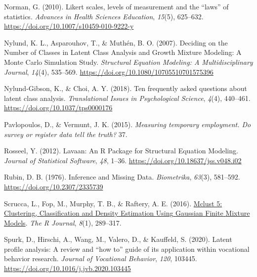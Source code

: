\documentclass[
  ,man,floatsintext]{apa6}
\newlength{\cslhangindent}
\newlength{\cslentryspacingunit} %
\newenvironment{CSLReferences}[2] %
 {%
  \setlength{\parindent}{0pt}
  \ifodd #1
  \let\oldpar\par
  \def\par{\hangindent=\cslhangindent\oldpar}
  \fi
  \setlength{\parskip}{#2\cslentryspacingunit}
 }%
 {}
\begin{document}
\begin{CSLReferences}{1}{0}
\leavevmode{}%
Norman, G. (2010). Likert scales, levels of measurement and the {``laws''} of statistics. \emph{Advances in Health Sciences Education}, \emph{15}(5), 625--632. \url{https://doi.org/10.1007/s10459-010-9222-y}

\leavevmode{}%
Nylund, K. L., Asparouhov, T., \& Muthén, B. O. (2007). Deciding on the {Number} of {Classes} in {Latent} {Class} {Analysis} and {Growth} {Mixture} {Modeling}: {A} {Monte} {Carlo} {Simulation} {Study}. \emph{Structural Equation Modeling: A Multidisciplinary Journal}, \emph{14}(4), 535--569. \url{https://doi.org/10.1080/10705510701575396}

\leavevmode{}%
Nylund-Gibson, K., \& Choi, A. Y. (2018). Ten frequently asked questions about latent class analysis. \emph{Translational Issues in Psychological Science}, \emph{4}(4), 440--461. \url{https://doi.org/10.1037/tps0000176}

\leavevmode{}%
Pavlopoulos, D., \& Vermunt, J. K. (2015). \emph{Measuring temporary employment. {Do} survey or register data tell the truth?} 37.

\leavevmode{}%
Rosseel, Y. (2012). Lavaan: {An} {R} {Package} for {Structural} {Equation} {Modeling}. \emph{Journal of Statistical Software}, \emph{48}, 1--36. \url{https://doi.org/10.18637/jss.v048.i02}

\leavevmode{}%
Rubin, D. B. (1976). Inference and {Missing} {Data}. \emph{Biometrika}, \emph{63}(3), 581--592. \url{https://doi.org/10.2307/2335739}

\leavevmode{}%
Scrucca, L., Fop, M., Murphy, T. B., \& Raftery, A. E. (2016). \href{https://www.ncbi.nlm.nih.gov/pmc/articles/PMC5096736}{Mclust 5: {Clustering}, {Classification} and {Density} {Estimation} {Using} {Gaussian} {Finite} {Mixture} {Models}}. \emph{The R Journal}, \emph{8}(1), 289--317.

\leavevmode{}%
Spurk, D., Hirschi, A., Wang, M., Valero, D., \& Kauffeld, S. (2020). Latent profile analysis: {A} review and {``how to''} guide of its application within vocational behavior research. \emph{Journal of Vocational Behavior}, \emph{120}, 103445. \url{https://doi.org/10.1016/j.jvb.2020.103445}


\end{CSLReferences}
\end{document}
